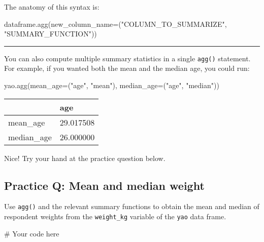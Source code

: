 \documentclass[
  letterpaper,
  DIV=11,
  numbers=noendperiod]{scrreprt}
\newenvironment{Shaded}{\begin{snugshade}}{\end{snugshade}}
\newcommand{\CommentTok}[1]{\textcolor[rgb]{0.37,0.37,0.37}{#1}}
\newcommand{\NormalTok}[1]{\textcolor[rgb]{0.00,0.23,0.31}{#1}}
\newcommand{\OperatorTok}[1]{\textcolor[rgb]{0.37,0.37,0.37}{#1}}
\newcommand{\StringTok}[1]{\textcolor[rgb]{0.13,0.47,0.30}{#1}}
\begin{document}
The anatomy of this syntax is:

\begin{Shaded}
\begin{Highlighting}[]
\NormalTok{dataframe.agg(new\_column\_name}\OperatorTok{=}\NormalTok{(}\StringTok{"COLUMN\_TO\_SUMMARIZE"}\NormalTok{, }\StringTok{"SUMMARY\_FUNCTION"}\NormalTok{))}
\end{Highlighting}
\end{Shaded}

\begin{center}\rule{0.5\linewidth}{0.5pt}\end{center}

You can also compute multiple summary statistics in a single
\texttt{agg()} statement. For example, if you wanted both the mean and
the median age, you could run:

\begin{Shaded}
\begin{Highlighting}[]
\NormalTok{yao.agg(mean\_age}\OperatorTok{=}\NormalTok{(}\StringTok{"age"}\NormalTok{, }\StringTok{"mean"}\NormalTok{), median\_age}\OperatorTok{=}\NormalTok{(}\StringTok{"age"}\NormalTok{, }\StringTok{"median"}\NormalTok{))}
\end{Highlighting}
\end{Shaded}

\begin{longtable}[]{@{}ll@{}}
\toprule\noalign{}
& age \\
\midrule\noalign{}
\endhead
\bottomrule\noalign{}
\endlastfoot
mean\_age & 29.017508 \\
median\_age & 26.000000 \\
\end{longtable}

Nice! Try your hand at the practice question below.

\begin{tcolorbox}[enhanced jigsaw, colframe=quarto-callout-tip-color-frame, opacityback=0, titlerule=0mm, bottomrule=.15mm, breakable, leftrule=.75mm, colbacktitle=quarto-callout-tip-color!10!white, title=\textcolor{quarto-callout-tip-color}{\faLightbulb}\hspace{0.5em}{Practice}, rightrule=.15mm, coltitle=black, opacitybacktitle=0.6, colback=white, left=2mm, arc=.35mm, toptitle=1mm, bottomtitle=1mm, toprule=.15mm]

\subsection{Practice Q: Mean and median
weight}\label{practice-q-mean-and-median-weight}

Use \texttt{agg()} and the relevant summary functions to obtain the mean
and median of respondent weights from the \texttt{weight\_kg} variable
of the \texttt{yao} data frame.

\begin{Shaded}
\begin{Highlighting}[]
\CommentTok{\# Your code here}
\end{Highlighting}
\end{Shaded}

\end{tcolorbox}
\end{document}
